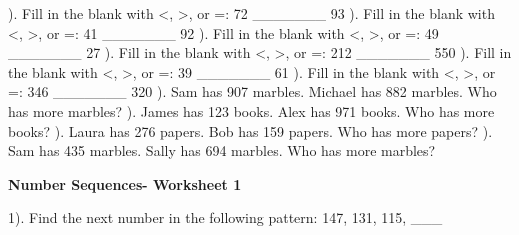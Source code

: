 \documentclass{article}%
\begin{document}
). Fill in the blank with <, >, or =: 72 \_\_\_\_\_\_\_ 93%
\newline%
\newline%
). Fill in the blank with <, >, or =: 41 \_\_\_\_\_\_\_ 92%
\newline%
\newline%
). Fill in the blank with <, >, or =: 49 \_\_\_\_\_\_\_ 27%
\newline%
\newline%
). Fill in the blank with <, >, or =: 212 \_\_\_\_\_\_\_ 550%
\newline%
\newline%
). Fill in the blank with <, >, or =: 39 \_\_\_\_\_\_\_ 61%
\newline%
\newline%
). Fill in the blank with <, >, or =: 346 \_\_\_\_\_\_\_ 320%
\newline%
\newline%
). Sam has 907 marbles. Michael has 882 marbles. Who has more marbles?%
\newline%
\newline%
). James has 123 books. Alex has 971 books. Who has more books?%
\newline%
\newline%
). Laura has 276 papers. Bob has 159 papers. Who has more papers?%
\newline%
\newline%
). Sam has 435 marbles. Sally has 694 marbles. Who has more marbles?%
\newline%
\newline%
\newline%
\pagebreak%
\large%
\begin{center}%
\textbf{Number Sequences- Worksheet 1}%
\newline%
\end{center} \normalsize%
1). Find the next number in the following pattern: 147, 131, 115, \_\_\_%
\newline%
\newline%
\end{document}
